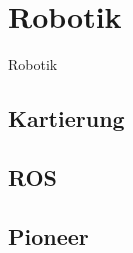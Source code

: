 \chapter{Robotik} %
\label{cha:robotik}

Robotik

\section{Kartierung} %
\label{sec:kartierung}


\section{ROS} %
\label{sec:ros}



\section{Pioneer} %
\label{sec:pioneer}


